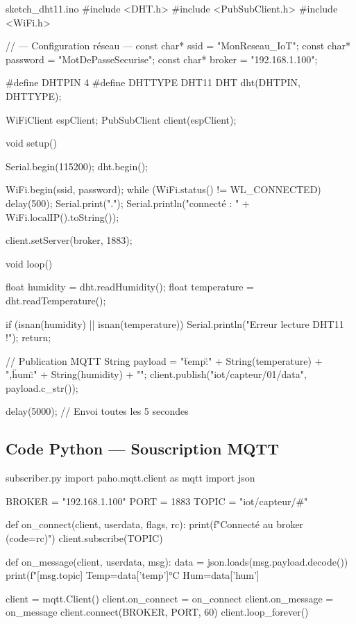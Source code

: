 \documentclass[12pt,a4paper]{report}
\begin{document}
\begin{codeblock}{sketch\_dht11.ino}
#include <DHT.h>
#include <PubSubClient.h>
#include <WiFi.h>

// --- Configuration réseau ---
const char* ssid     = "MonReseau_IoT";
const char* password = "MotDePasseSecurise";
const char* broker   = "192.168.1.100";

#define DHTPIN  4
#define DHTTYPE DHT11
DHT dht(DHTPIN, DHTTYPE);

WiFiClient   espClient;
PubSubClient client(espClient);

void setup() {
    Serial.begin(115200);
    dht.begin();

    WiFi.begin(ssid, password);
    while (WiFi.status() != WL_CONNECTED) {
        delay(500);
        Serial.print(".");
    }
    Serial.println("\nWiFi connecté : " + WiFi.localIP().toString());

    client.setServer(broker, 1883);
}

void loop() {
    float humidity    = dht.readHumidity();
    float temperature = dht.readTemperature();

    if (isnan(humidity) || isnan(temperature)) {
        Serial.println("Erreur lecture DHT11 !");
        return;
    }

    // Publication MQTT
    String payload = "{\"temp\":" + String(temperature) +
                     ",\"hum\":"  + String(humidity)    + "}";
    client.publish("iot/capteur/01/data", payload.c_str());

    delay(5000); // Envoi toutes les 5 secondes
}
\end{codeblock}

\vspace{0.5em}

\subsection{Code Python — Souscription MQTT}

\begin{codeblock}[listing options={language=Python}]{subscriber.py}
import paho.mqtt.client as mqtt
import json

BROKER  = "192.168.1.100"
PORT    = 1883
TOPIC   = "iot/capteur/#"

def on_connect(client, userdata, flags, rc):
    print(f"Connecté au broker (code={rc})")
    client.subscribe(TOPIC)

def on_message(client, userdata, msg):
    data = json.loads(msg.payload.decode())
    print(f"[{msg.topic}] Temp={data['temp']}°C  Hum={data['hum']}%

client = mqtt.Client()
client.on_connect = on_connect
client.on_message = on_message
client.connect(BROKER, PORT, 60)
client.loop_forever()
\end{codeblock}
\end{document}
